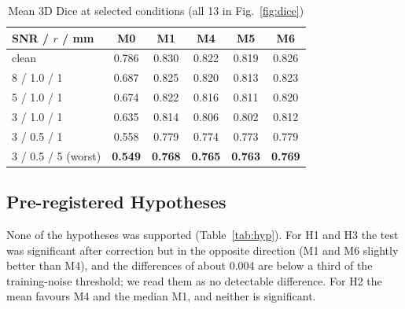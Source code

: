 \documentclass[conference]{IEEEtran}
\begin{document}
\begin{table}[t]
\caption{Mean 3D Dice at selected conditions (all 13 in Fig.~\ref{fig:dice})}
\label{tab:dice}
\centering\footnotesize
\begin{tabular}{@{}lccccc@{}}
\toprule
SNR / $r$ / mm & M0 & M1 & M4 & M5 & M6 \\
\midrule
clean & 0.786 & 0.830 & 0.822 & 0.819 & 0.826 \\
8 / 1.0 / 1 & 0.687 & 0.825 & 0.820 & 0.813 & 0.823 \\
5 / 1.0 / 1 & 0.674 & 0.822 & 0.816 & 0.811 & 0.820 \\
3 / 1.0 / 1 & 0.635 & 0.814 & 0.806 & 0.802 & 0.812 \\
3 / 0.5 / 1 & 0.558 & 0.779 & 0.774 & 0.773 & 0.779 \\
3 / 0.5 / 5 (worst) & \textbf{0.549} & \textbf{0.768} & \textbf{0.765} & \textbf{0.763} & \textbf{0.769} \\
\bottomrule
\end{tabular}
\end{table}

\subsection{Pre-registered Hypotheses}
None of the hypotheses was supported (Table~\ref{tab:hyp}). For H1 and H3 the test was significant after
correction but in the opposite direction (M1 and M6 slightly better than M4), and the differences of about
0.004 are below a third of the training-noise threshold; we read them as no detectable difference. For H2 the
mean favours M4 and the median M1, and neither is significant.

\begin{table}[t]
\caption{Pre-registered tests at the worst condition (positive = M4 better)}
\label{tab:hyp}
\centering\footnotesize
\setlength{\tabcolsep}{3pt}
\end{table}
\end{document}

